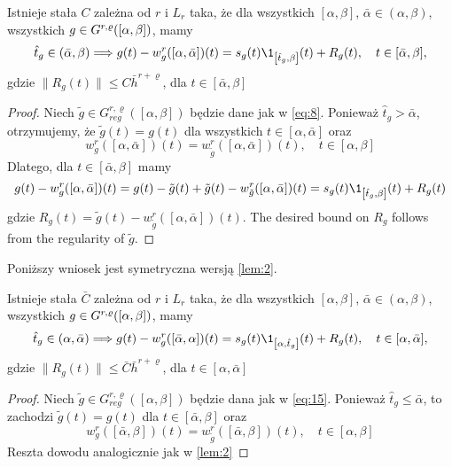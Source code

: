 \documentclass[oik, pdftex, robocza, man]{mgrwms}
\begin{document}
    \begin{lemma} \label{lem:2}
        Istnieje stała $C$ zależna od $r$ i $L_{r}$ taka, że dla wszystkich $[\alpha, \beta]$, $\bar{\alpha} \in (\alpha, \beta)$, wszystkich $g \in G^{r,\varrho}([\alpha,\beta])$, mamy
        \begin{equation*}
            \hat{t}_{g} \in(\bar{\alpha}, \beta) \Longrightarrow g(t)-w_{g}^{r}([\alpha, \bar{\alpha}])(t)=s_{g}(t) \1_{\left[\hat{t}_{g}, \beta\right]}(t)+R_{g}(t), \quad t \in[\bar{\alpha}, \beta],
        \end{equation*}
        gdzie $\| R_{g}(t) \| \leq C\bar{h}^{r+\varrho}$, dla $t \in [\bar{\alpha}, \beta]$
    \end{lemma}
    \begin{proof}
        Niech $\tilde{g} \in G_{reg}^{r, \varrho}([\alpha, \beta])$ będzie dane jak w \eqref{eq:8}. Ponieważ $\hat{t}_{g}>\bar{\alpha}$, otrzymujemy, że $\tilde{g}(t)=g(t)$ dla wszystkich $t \in[\alpha, \bar{\alpha}]$ oraz
        \begin{equation*}
            w_{g}^{r}([\alpha, \bar{\alpha}])(t)=w_{\tilde{g}}^{r}([\alpha, \bar{\alpha}])(t), \quad t \in[\alpha, \beta]
        \end{equation*}
        Dlatego, dla $t \in[\bar{\alpha}, \beta]$ mamy
        \begin{equation}
            g(t)-w_{g}^{r}([\alpha, \bar{\alpha}])(t)=g(t)-\tilde{g}(t)+\tilde{g}(t)-w_{\tilde{g}}^{r}([\alpha, \bar{\alpha}])(t)=s_{g}(t) \1_{\left[\hat{t}_{g}, \beta\right]}(t)+R_{g}(t)
        \end{equation}
        gdzie $R_{g}(t)=\tilde{g}(t)-w_{\tilde{g}}^{r}([\alpha, \bar{\alpha}])(t) .$ The desired bound on $R_{g}$ follows from the regularity of $\tilde{g}$.    
    \end{proof}

    Poniższy wniosek jest symetryczna wersją \eqref{lem:2}.

    \begin{cor}
        Istnieje stała $\bar{C}$ zależna od $r$ i $L_{r}$ taka, że dla wszystkich $[\alpha, \beta]$, $\bar{\alpha} \in (\alpha, \beta)$, wszystkich $g \in G^{r,\varrho}([\alpha,\beta])$, mamy
        \begin{equation*}
            \hat{t}_{g} \in (\alpha,\bar{\alpha}) \Longrightarrow g(t)-w_{g}^{r}([\bar{\alpha}, \alpha])(t)=s_{g}(t) \1_{\left[\alpha,\hat{t}_{g}\right]}(t)+R_{g}(t), \quad t \in[\alpha,\bar{\alpha}],
        \end{equation*}
        gdzie $\| R_{g}(t) \| \leq \bar{C}\bar{h}^{r+\varrho}$, dla $t \in [\alpha,\bar{\alpha}]$
    \end{cor}
    \begin{proof}
        Niech $\tilde{g} \in G_{reg}^{r, \varrho}([\alpha, \beta])$ będzie dana jak w \eqref{eq:15}. Ponieważ $\hat{t}_{g} \leq \bar{\alpha}$, to zachodzi $\tilde{g}(t)=g(t)$ dla $t \in[\bar{\alpha}, \beta]$ oraz
        \begin{equation*}
            w_{g}^{r}([\bar{\alpha}, \beta])(t)=w_{\tilde{g}}^{r}([\bar{\alpha}, \beta])(t), \quad t \in[\alpha, \beta]
        \end{equation*}
        Reszta dowodu analogicznie jak w \eqref{lem:2}
    \end{proof}
\end{document}
